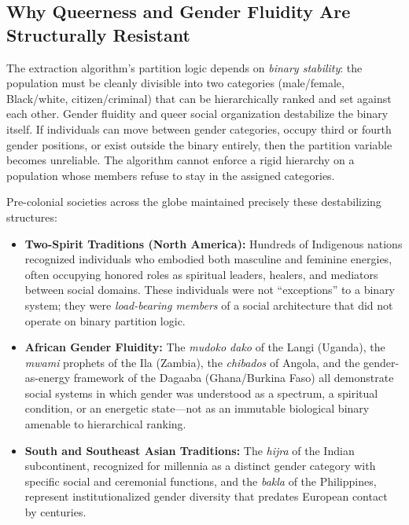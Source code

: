 \documentclass[12pt,openany]{book}
\begin{document}
\subsection{Why Queerness and Gender Fluidity Are Structurally Resistant}

The extraction algorithm's partition logic depends on \textit{binary stability}: the population must be cleanly divisible into two categories (male/female, Black/white, citizen/criminal) that can be hierarchically ranked and set against each other. Gender fluidity and queer social organization destabilize the binary itself. If individuals can move between gender categories, occupy third or fourth gender positions, or exist outside the binary entirely, then the partition variable becomes unreliable. The algorithm cannot enforce a rigid hierarchy on a population whose members refuse to stay in the assigned categories.

Pre-colonial societies across the globe maintained precisely these destabilizing structures:

\begin{itemize}
    \item \textbf{Two-Spirit Traditions (North America):} Hundreds of Indigenous nations recognized individuals who embodied both masculine and feminine energies, often occupying honored roles as spiritual leaders, healers, and mediators between social domains. These individuals were not ``exceptions'' to a binary system; they were \textit{load-bearing members} of a social architecture that did not operate on binary partition logic.

    \item \textbf{African Gender Fluidity:} The \textit{mudoko dako} of the Langi (Uganda), the \textit{mwami} prophets of the Ila (Zambia), the \textit{chibados} of Angola, and the gender-as-energy framework of the Dagaaba (Ghana/Burkina Faso) all demonstrate social systems in which gender was understood as a spectrum, a spiritual condition, or an energetic state---not as an immutable biological binary amenable to hierarchical ranking.

    \item \textbf{South and Southeast Asian Traditions:} The \textit{hijra} of the Indian subcontinent, recognized for millennia as a distinct gender category with specific social and ceremonial functions, and the \textit{bakla} of the Philippines, represent institutionalized gender diversity that predates European contact by centuries.
\end{itemize}
\end{document}
